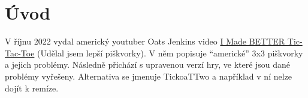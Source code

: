 \makeatletter
\renewcommand{\@chapapp}{}%
\newenvironment{chapquote}[2][2em]
  {\setlength{\@tempdima}{#1}%
   \def\chapquote@author{#2}%
   \parshape 1 \@tempdima \dimexpr\textwidth-2\@tempdima\relax%
   \itshape}
  {\par\normalfont\hfill--\ \chapquote@author\hspace*{\@tempdima}\par\bigskip}
\makeatother

\chapter*{Úvod}

V říjnu 2022 vydal americký youtuber Oats Jenkins video
\href{https://www.youtube.com/watch?v=ePxrVU4M9uA}{I Made BETTER Tic-Tac-Toe}
(Udělal jsem lepší piškvorky). V něm popisuje \enquote{americké} 3x3 piškvorky a jejich
problémy. Následně přichází s upravenou verzí hry, ve které jsou dané problémy vyřešeny.
Alternativa se jmenuje TickoaTTwo a například v ní nelze dojít k remíze.
